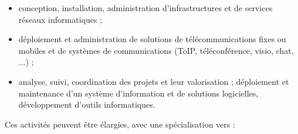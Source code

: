 \medskip
\begin{itemize}[leftmargin=5ex]
\item conception, installation, administration d'infrastructures et de services réseaux informatiques ;
\item déploiement et administration de  solutions de télécommunications fixes ou mobiles et de systèmes de communi\-cations (ToIP, téléconférence, visio, chat, ...) ;
\item analyse, suivi, coordination des projets et leur valorisation ;
déploiement et maintenance d'un système d'infor\-mation et de solutions logicielles, développement d'outils informatiques.
\end{itemize}

\medskip
Ces activités peuvent être élargies, avec une  spécialisation vers : 

